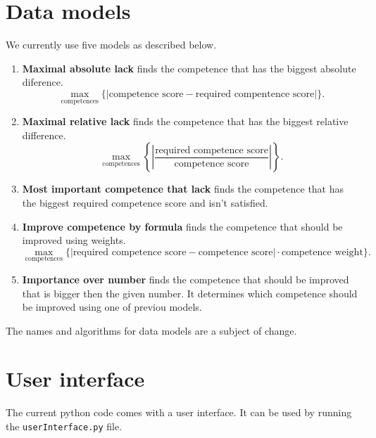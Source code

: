 \documentclass[12pt, a4paper]{article}
\begin{document}
	\section{Data models}
	We currently use five models as described below.
	\begin{enumerate}
		\item 
		\textbf{Maximal absolute lack} finds the competence that has the biggest absolute diference.
		$$\max_{\text{competences}}\{|\text{competence score} - \text{required compentence score}|\}.$$
		\item 
		\textbf{Maximal relative lack} finds the competence that has the biggest relative difference.
		$$\max_{\text{competences}}\left\{\left|\frac{\text{required competence score}}{\text{competence score}}\right|\right\}.$$
		\item 
		\textbf{Most important competence that lack} finds the competence that has the biggest required competence score and isn't satisfied.
		\item 
		\textbf{Improve competence by formula} finds the competence that should be improved using weights.
		$$\max_{\text{competences}}\{|\text{required competence score} - \text{competence score}|\cdot\text{competence weight}\}.$$
		\item 
		\textbf{Importance over number} finds the competence that should be improved that is bigger then the given number. It determines which competence should be improved using one of previou models.
	\end{enumerate}
	The names and algorithms for data models are a subject of change.
	\section{User interface}
	The current python code comes with a user interface. It can be used by running the \texttt{userInterface.py} file. 
\end{document}
